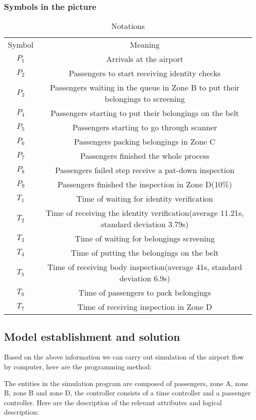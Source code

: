 \subsubsection*{Symbols in the picture}
\begin{table}[H]
\centering
\caption{Notations}\label{tab:notations}
\begin{tabular}{|c|c|}
\hline
Symbol& Meaning\\
$P_{1}$& Arrivals at the airport \\
\hline
$P_{2}$& Passengers to start receiving identity checks \\\hline
$P_{3}$& Passengers waiting in the queue in Zone B to put their belongings to screening \\\hline
$P_{4}$& Passengers starting to put their belongings on the belt\\\hline
$P_{5}$& Passengers starting to go through scanner\\\hline
$P_{6}$& Passengers packing belongings in Zone C\\\hline
$P_{7}$& Passengers finished the whole process\\\hline
$P_{8}$& Passengers failed step receive a pat-down inspection\\\hline
$P_{9}$& Passengers finished the inspection in Zone D(10\%)
\\\hline
$T_{1}$& Time of waiting for identity verification \\\hline
$T_{2}$& Time of receiving the identity verification(average 11.21s, standard deviation 3.79s) \\\hline
$T_{3}$& Time of waiting for belongings screening\\\hline
$T_{4}$& Time of putting the belongings on the belt\\\hline
$T_{5}$& Time of receiving body inspection(average 41s, standard deviation 6.9s)\\\hline
$T_{6}$& Time of passengers to pack belongings
\\\hline
$T_{7}$& Time of receiving inspection in Zone D
\\\hline

\hline
\end{tabular}
\end{table}


\subsection{Model establishment and solution}
 Based on the above information we can carry out simulation of the airport flow by computer, here are the programming method:
\par
 The entities in the simulation program are composed of passengers, zone A, zone B, zone B and zone D, the controller consists of a time controller and a passenger controller. Here are the description of the relevant attributes and logical description:
